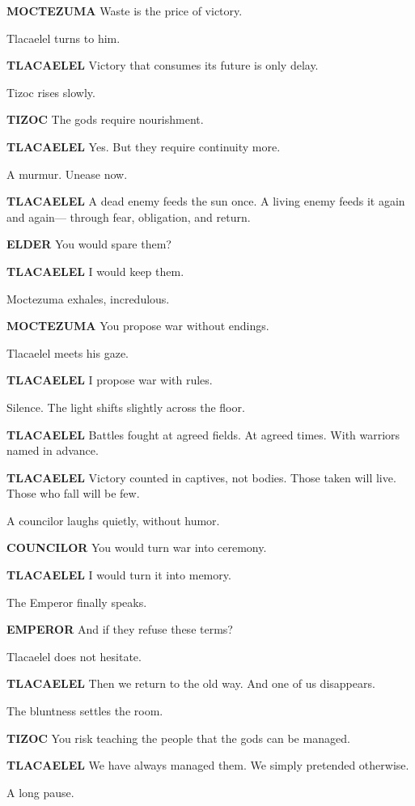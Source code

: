 \documentclass[12pt]{article}
\begin{document}
\textbf{MOCTEZUMA}  
Waste is the price of victory.

Tlacaelel turns to him.

\textbf{TLACAELEL}  
Victory that consumes its future  
is only delay.

Tizoc rises slowly.

\textbf{TIZOC}  
The gods require nourishment.

\textbf{TLACAELEL}  
Yes.  
But they require continuity more.

A murmur. Unease now.

\textbf{TLACAELEL}  
A dead enemy feeds the sun once.  
A living enemy feeds it again and again—  
through fear, obligation, and return.

\textbf{ELDER}  
You would spare them?

\textbf{TLACAELEL}  
I would keep them.

Moctezuma exhales, incredulous.

\textbf{MOCTEZUMA}  
You propose war without endings.

Tlacaelel meets his gaze.

\textbf{TLACAELEL}  
I propose war with rules.

Silence. The light shifts slightly across the floor.

\textbf{TLACAELEL}  
Battles fought at agreed fields.  
At agreed times.  
With warriors named in advance.

\textbf{TLACAELEL}  
Victory counted in captives, not bodies.  
Those taken will live.  
Those who fall will be few.

A councilor laughs quietly, without humor.

\textbf{COUNCILOR}  
You would turn war into ceremony.

\textbf{TLACAELEL}  
I would turn it into memory.

The Emperor finally speaks.

\textbf{EMPEROR}  
And if they refuse these terms?

Tlacaelel does not hesitate.

\textbf{TLACAELEL}  
Then we return to the old way.  
And one of us disappears.

The bluntness settles the room.

\textbf{TIZOC}  
You risk teaching the people  
that the gods can be managed.

\textbf{TLACAELEL}  
We have always managed them.  
We simply pretended otherwise.

A long pause.
\end{document}
